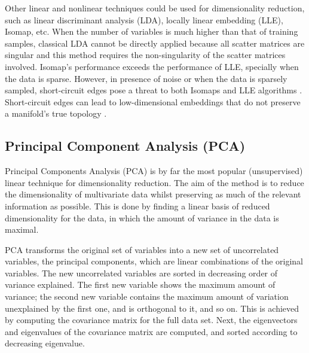 \documentclass[a4paper,fleqn,usenatbib]{mnras}
\begin{document}
Other linear and nonlinear techniques could be used for dimensionality 
reduction, such as linear discriminant analysis (LDA), locally linear 
embedding (LLE), Isomap, etc. When the number of variables is much 
higher than that of training samples, classical LDA cannot be directly 
applied because all scatter matrices are singular and this method 
requires the non-singularity of the scatter matrices involved. 
Isomap's performance exceeds the performance of LLE, specially when 
the data is sparse. However, in presence of noise or when the data 
is sparsely sampled, short-circuit edges pose a threat to both Isomaps 
and LLE algorithms \citep{saxena:04}. Short-circuit edges can lead to 
low-dimensional embeddings that do not preserve a manifold's true topology \citep{balasubramanianISOMAP:02}.



\subsection{Principal Component Analysis (PCA)}

Principal Components Analysis (PCA) \citep{hotelling:33,pearson:01} is
by far the most popular (unsupervised) linear technique for
dimensionality reduction. The aim of the method is to reduce the
dimensionality of multivariate data whilst preserving as much of the
relevant information as possible. This is done by finding a linear
basis of reduced dimensionality for the data, in which the amount of
variance in the data is maximal.

PCA transforms the original set of variables into a new set of
uncorrelated variables, the principal components, which are linear
combinations of the original variables. The new uncorrelated variables
are sorted in decreasing order of variance explained. The first
new variable shows the maximum amount of variance; the second
new variable contains the maximum amount of variation unexplained by
the first one, and is orthogonal to it, and so on.  This is
achieved by computing the covariance matrix for the full data
set. Next, the eigenvectors and eigenvalues of the covariance matrix
are computed, and sorted according to decreasing eigenvalue.
\end{document}
